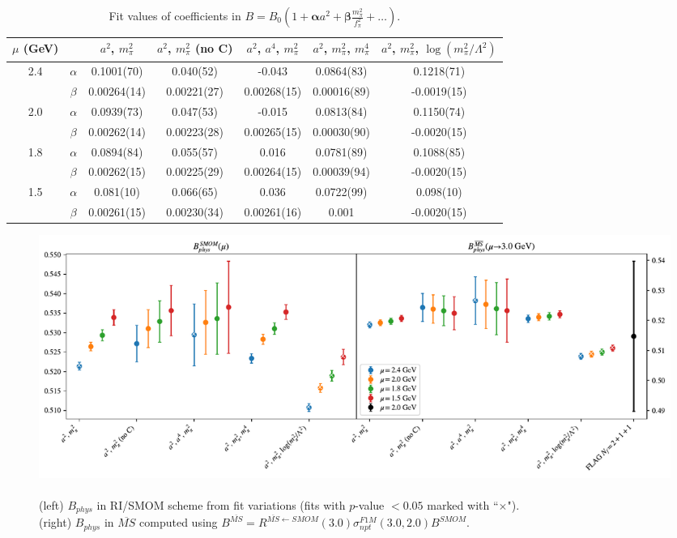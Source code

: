 \documentclass[12pt]{extarticle}
\begin{document}
\begin{table}[h!]
\begin{center}
\begin{tabular}{|c c|c|c|c|c|c|}
\hline
$\mu$ (GeV) &  & $a^2$, $m_\pi^2$& $a^2$, $m_\pi^2$ (no C)& $a^2$, $a^4$, $m_\pi^2$& $a^2$, $m_\pi^2$, $m_\pi^4$& $a^2$, $m_\pi^2$, $\log(m_\pi^2/\Lambda^2)$\\
\hline
\multirow{2}{0.5in}{2.4} & $\alpha$ & 0.1001(70)& 0.040(52)& -0.043& 0.0864(83)& 0.1218(71)\\
 & $\beta$ & 0.00264(14)& 0.00221(27)& 0.00268(15)& 0.00016(89)& -0.0019(15)\\
\hline
\multirow{2}{0.5in}{2.0} & $\alpha$ & 0.0939(73)& 0.047(53)& -0.015& 0.0813(84)& 0.1150(74)\\
 & $\beta$ & 0.00262(14)& 0.00223(28)& 0.00265(15)& 0.00030(90)& -0.0020(15)\\
\hline
\multirow{2}{0.5in}{1.8} & $\alpha$ & 0.0894(84)& 0.055(57)& 0.016& 0.0781(89)& 0.1088(85)\\
 & $\beta$ & 0.00262(15)& 0.00225(29)& 0.00264(15)& 0.00039(94)& -0.0020(15)\\
\hline
\multirow{2}{0.5in}{1.5} & $\alpha$ & 0.081(10)& 0.066(65)& 0.036& 0.0722(99)& 0.098(10)\\
 & $\beta$ & 0.00261(15)& 0.00230(34)& 0.00261(16)& 0.001& -0.0020(15)\\
\hline
\end{tabular}
\caption{Fit values of coefficients in $B = B_0(1 + \mathbf{\alpha} a^2 + \mathbf{\beta} \frac{m_\pi^2}{f_\pi^2} + \ldots)$.}
\end{center}
\end{table}
\begin{figure}
\centering
\includegraphics[page=1, width=1.1\textwidth]{plots/VVpAA_fit_summary.pdf}
\caption{\\(left) $B_{phys}$ in RI/SMOM scheme from fit variations (fits with $p$-value $<0.05$ marked with ``$\times$"). \\(right) $B_{phys}$ in $\overline{MS}$ computed using $B^{\overline{MS}} = R^{\overline{MS}\leftarrow SMOM}(3.0)\sigma_{npt}^{F1M}(3.0, 2.0) B^{SMOM}$.}
\end{figure}
\end{document}
